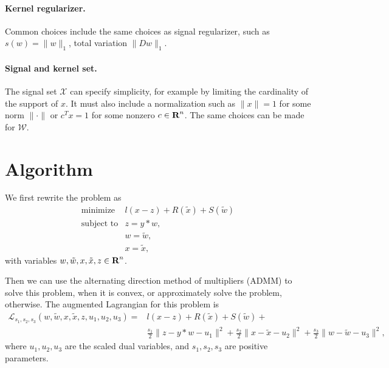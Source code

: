 \documentclass[12pt]{article}
\begin{document}
\paragraph{Kernel regularizer.} 
Common choices include the same choices as signal regularizer, such as $s(w) = \|w\|_1$, total variation $\|Dw\|_1$. 

\paragraph{Signal and kernel set.}
The signal set  $\mathcal X$ can specify simplicity, for example by limiting the cardinality
of the support of $x$.  It must also include a normalization such as 
$\|x\|=1$ for some norm $\|\cdot \|$ or $c^Tx=1$ for some nonzero $c\in {\mbox{\bf R}}^n$.
The same choices can be made for $\mathcal W$.

\section{Algorithm}
We first rewrite the problem as
\[
\begin{array}{ll}
\mbox{minimize}   & l(x-z)+R(\tilde{x})+ S(\tilde{w}) \\
\mbox{subject to}  & z = y*w,\\
& w = \tilde{w},\\
& x = \tilde{x},
\end{array}
\]
with variables $w, \tilde{w}, x, \tilde{x}, z\in {\mbox{\bf R}}^n$.

Then we can use the alternating direction method of multipliers (ADMM) to solve this problem,
when it is convex, or approximately solve the problem, otherwise.
The augmented Lagrangian for this problem is 
\[
\begin{array}{ll}
 \mathcal{L}_{s_1, s_2,s_3}(w, \tilde{w},x, \tilde{x}, z, u_1, u_2, u_3)=& l(x-z)+R(\tilde{x})+ S(\tilde{w})+\\
 & \frac{s_1}{2} \| z -y*w -u_1\|^2 +
 \frac{s_2}{2} \| x- \tilde{x}-u_2\|^2+
 \frac{s_3}{2} \| w- \tilde{w}-u_3\|^2,
\end{array}
\]
where $u_1, u_2, u_3$ are the scaled dual variables, and $s_1, s_2,s_3$ are positive parameters.
\end{document}
